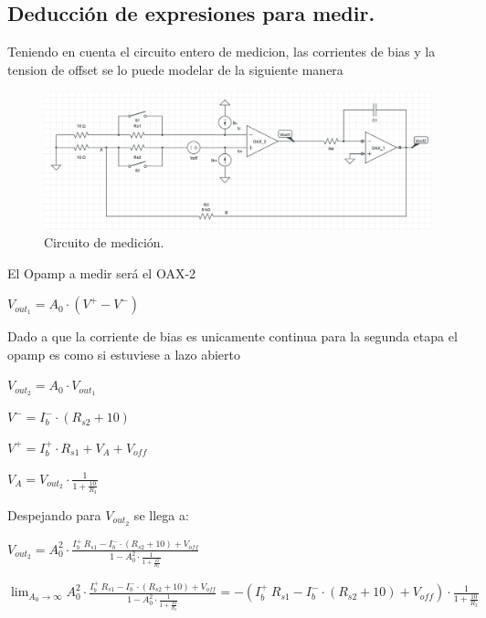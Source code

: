 \subsection{Deducción de expresiones para medir.}

Teniendo en cuenta el circuito entero de medicion, las corrientes de bias y la tension de offset se lo puede modelar de la siguiente manera
\begin{figure}[H]	
	\centering
	\includegraphics[width=\textwidth]{imagenes/Medicion.PNG}
	\caption{Circuito de medición.}
	\label{fig:Medicion}
\end{figure}
El Opamp a medir será el OAX-2
\begin{center}$V_{out_1}=A_0 \cdot (V^+ - V^-)$\\\end{center}
Dado a que la corriente de bias es unicamente continua para la segunda etapa el opamp es como si estuviese a lazo abierto\\
\begin{center}$V_{out_2}=A_0 \cdot V_{out_1}$\\\end{center}
\begin{center}$V^-=I_b^- \cdot (R_{s2}+10)$\\\end{center}
\begin{center}$V^+=I_b^+ \cdot R_{s1} +V_A+V_{off}$\\\end{center}
\begin{center}$V_A=V_{out_2} \cdot \frac{1}{1+\frac{10}{R_3}}$\\\end{center}
Despejando para $V_{out_2}$ se llega a:
\begin{center}$V_{out_2}=A_0^2  \cdot \frac{I_b^+ \ R_{s1} -I_b^-\cdot (R_{s2}+10)+V_{off}}{1-A_0^2 \cdot \frac{1}{1+\frac{10}{R_3}}}$\\\end{center}
$\lim_{A_0\to\infty} A_0^2  \cdot \frac{I_b^+ \ R_{s1} -I_b^-\cdot (R_{s2}+10)+V_{off}}{1-A_0^2 \cdot \frac{1}{1+\frac{10}{R_3}}}=-(I_b^+ \ R_{s1} -I_b^-\cdot (R_{s2}+10)+V_{off})\cdot \frac{1}{1+\frac{10}{R_3}} $
